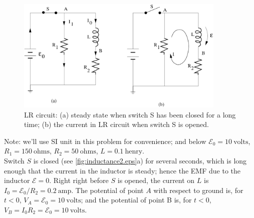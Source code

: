 \documentclass[makesolutionspdf]{esg8022pset}
\begin{document}
\begin{solution}
  \begin{figure}[H]
    \centering
    \includegraphics[width = 10cm]{inductance2}
    \caption{LR circuit: (a) steady state when switch S has been closed for a
      long time; (b) the current in LR circuit when switch S is opened.}
    \label{fig:inductance2.eps}
  \end{figure}

  Note: we'll use SI unit in this problem for convenience; and below
  ${\mathcal{E}}_0=10\:\text{volts}$, $R_1=150\:\text{ohms}$, $R_2=50\:\text{ohms}$,
  $L=0.1\:\text{henry}$.\\

  Switch $S$ is closed (see \autoref{fig:inductance2.eps}a) for several
  seconds, which is long enough that the current in the inductor is
  steady; hence the EMF due to the inductor ${\mathcal{E}}=0$.  Right
  right before $S$ is opened, the current on $L$ is $I_0 =
  {\mathcal{E}}_0/R_2 = 0.2\:\text{amp}$.  The potential of point $A$ with
  respect to ground is, for $t<0$, $V_A = {\mathcal{E}}_0 = 10\:\text{volts}$;
  and the potential of point B is, for $t<0$, $V_B=I_0 R_2=
  {\mathcal{E}}_0=10\:\text{volts}$.\\


\end{solution}
\end{document}
